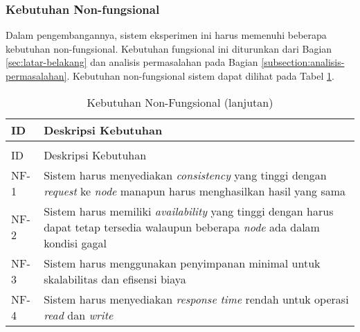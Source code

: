 \subsubsection{Kebutuhan Non-fungsional}
\label{subsubsection:non-functional-requirements}

Dalam pengembangannya, sistem eksperimen ini harus memenuhi beberapa kebutuhan non-fungsional. Kebutuhan fungsional ini diturunkan dari Bagian \ref{sec:latar-belakang} dan analisis permasalahan pada Bagian \ref{subsection:analisis-permasalahan}. Kebutuhan non-fungsional sistem dapat dilihat pada Tabel \ref{tab:non-functional-requirements}.

\begin{longtable}{|l|p{13cm}|}
	\caption{Kebutuhan Non-Fungsional}
	\label{tab:non-functional-requirements}                                                                                                                                    \\
	\hline
	\rowcolor{black!10} ID & Deskripsi Kebutuhan                                                                                                                               \\ \hline
	\endfirsthead

	\caption[]{Kebutuhan Non-Fungsional (lanjutan)}                                                                                                                            \\
	\hline
	\rowcolor{black!10} ID & Deskripsi Kebutuhan                                                                                                                               \\ \hline
	\endhead

	NF-1                   & Sistem harus menyediakan \textit{consistency} yang tinggi dengan \textit{request} ke \textit{node} manapun harus menghasilkan hasil yang sama     \\ \hline
	NF-2                   & Sistem harus memiliki \textit{availability} yang tinggi dengan harus dapat tetap tersedia walaupun beberapa \textit{node} ada dalam kondisi gagal \\ \hline
	NF-3                   & Sistem harus menggunakan penyimpanan minimal untuk skalabilitas dan efisensi biaya                                                                \\ \hline
	NF-4                   & Sistem harus menyediakan \textit{response time} rendah untuk operasi \textit{read} dan \textit{write}                                             \\ \hline
\end{longtable}